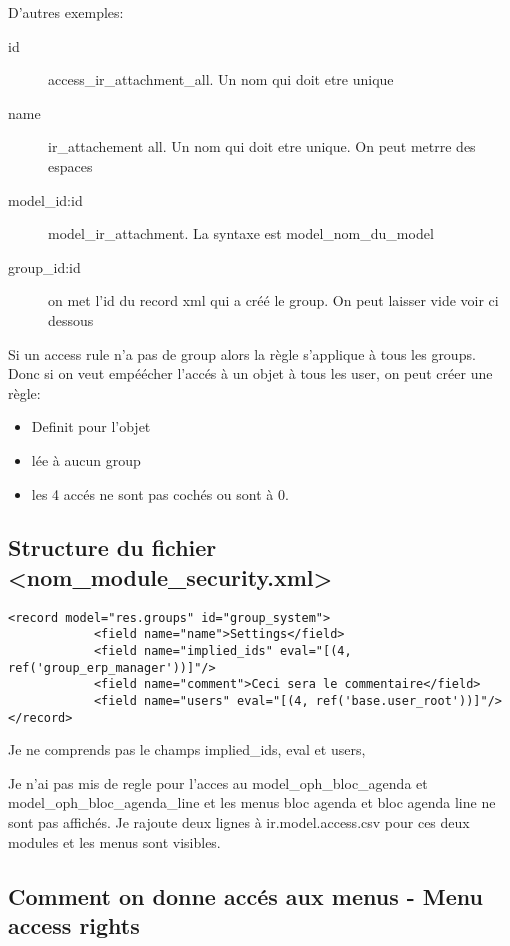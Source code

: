 \documentclass[12pt,a4paper]{article}
\begin{document}
D'autres exemples:
\begin{description}
\item[id] access\_ir\_attachment\_all. Un nom qui doit etre unique
\item[name] ir\_attachement all. Un nom qui doit etre unique. On peut metrre des espaces
\item[model\_id:id] model\_ir\_attachment. La syntaxe est model\_nom\_du\_model
\item[group\_id:id] on met l'id du record xml qui a créé le group. On peut laisser vide voir ci dessous
\end{description}
Si un access rule n'a pas de group alors la règle s'applique à tous les groups. Donc si on veut empéécher l'accés à un objet à tous les user, on peut créer une règle:
\begin{itemize}
\item Definit pour l'objet
\item lée à aucun group
\item les 4 accés ne sont pas cochés ou sont à 0.
\end{itemize}


\subsection{Structure du fichier <nom\_module\_security.xml>}
\label{sec:securtity.xml}

\begin{verbatim}
<record model="res.groups" id="group_system">
            <field name="name">Settings</field>
            <field name="implied_ids" eval="[(4, ref('group_erp_manager'))]"/>
            <field name="comment">Ceci sera le commentaire</field>
            <field name="users" eval="[(4, ref('base.user_root'))]"/>
</record>
\end{verbatim}

Je ne comprends pas le champs implied\_ids,  eval et users,

Je n'ai pas mis de regle pour l'acces au model\_oph\_bloc\_agenda et model\_oph\_bloc\_agenda\_line et les menus bloc agenda et bloc agenda line ne sont pas affichés. Je rajoute deux lignes à ir.model.access.csv pour ces deux modules et les menus sont visibles. 

\subsection{Comment on donne accés aux menus - Menu access rights}
\label{sec:menu_access}
\end{document}
